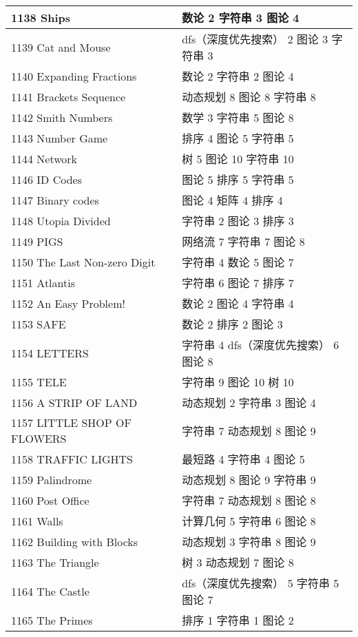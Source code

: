 \begin{longtable}{| p{} | p{} |}
 1138 Ships  & 数论 2 字符串 3 图论 4 \\ \hline
 1139 Cat and Mouse  & dfs（深度优先搜索） 2 图论 3 字符串 3 \\ \hline
 1140 Expanding Fractions  & 数论 2 字符串 2 图论 4 \\ \hline
 1141 Brackets Sequence  & 动态规划 8 图论 8 字符串 8 \\ \hline
 1142 Smith Numbers  & 数学 3 字符串 5 图论 8 \\ \hline
 1143 Number Game  & 排序 4 图论 5 字符串 5 \\ \hline
 1144 Network  & 树 5 图论 10 字符串 10 \\ \hline
 1146 ID Codes  & 图论 5 排序 5 字符串 5 \\ \hline
 1147 Binary codes  & 图论 4 矩阵 4 排序 4 \\ \hline
 1148 Utopia Divided  & 字符串 2 图论 3 排序 3 \\ \hline
 1149 PIGS  & 网络流 7 字符串 7 图论 8 \\ \hline
 1150 The Last Non-zero Digit  & 字符串 4 数论 5 图论 7 \\ \hline
 1151 Atlantis  & 字符串 6 图论 7 排序 7 \\ \hline
 1152 An Easy Problem!  & 数论 2 图论 4 字符串 4 \\ \hline
 1153 SAFE  & 数论 2 排序 2 图论 3 \\ \hline
 1154 LETTERS  & 字符串 4 dfs（深度优先搜索） 6 图论 8 \\ \hline
 1155 TELE  & 字符串 9 图论 10 树 10 \\ \hline
 1156 A STRIP OF LAND  & 动态规划 2 字符串 3 图论 4 \\ \hline
 1157 LITTLE SHOP OF FLOWERS  & 字符串 7 动态规划 8 图论 9 \\ \hline
 1158 TRAFFIC LIGHTS  & 最短路 4 字符串 4 图论 5 \\ \hline
 1159 Palindrome  & 动态规划 8 图论 9 字符串 9 \\ \hline
 1160 Post Office  & 字符串 7 动态规划 8 图论 8 \\ \hline
 1161 Walls  & 计算几何 5 字符串 6 图论 8 \\ \hline
 1162 Building with Blocks  & 动态规划 3 字符串 8 图论 9 \\ \hline
 1163 The Triangle  & 树 3 动态规划 7 图论 8 \\ \hline
 1164 The Castle  & dfs（深度优先搜索） 5 字符串 5 图论 7 \\ \hline
 1165 The Primes  & 排序 1 字符串 1 图论 2 \\ \hline

\end{longtable}
